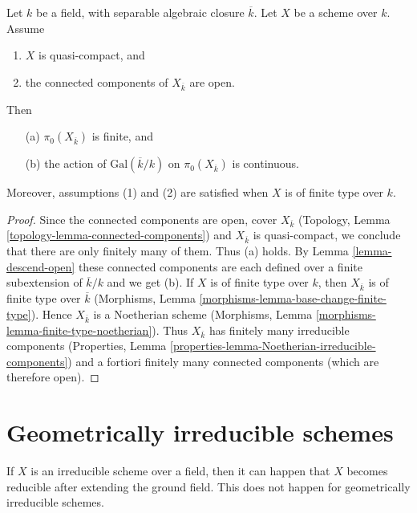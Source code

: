 \begin{lemma}
\label{lemma-galois-action-connected-components-continuous}
Let $k$ be a field, with separable algebraic closure $\overline{k}$.
Let $X$ be a scheme over $k$.
Assume
\begin{enumerate}
\item $X$ is quasi-compact, and
\item the connected components of $X_{\overline{k}}$ are open.
\end{enumerate}
Then
\begin{enumerate}
\item[(a)] $\pi_0(X_{\overline{k}})$ is finite, and
\item[(b)] the action of $\text{Gal}(\overline{k}/k)$ on
$\pi_0(X_{\overline{k}})$ is continuous.
\end{enumerate}
Moreover, assumptions (1) and (2) are satisfied when $X$ is
of finite type over $k$.
\end{lemma}

\begin{proof}
Since the connected components are open, cover $X_{\overline{k}}$
(Topology, Lemma \ref{topology-lemma-connected-components}) and
$X_{\overline{k}}$ is quasi-compact, we conclude that there are only
finitely many of them. Thus (a) holds.
By Lemma \ref{lemma-descend-open} these connected components
are each defined over a finite subextension of $\overline{k}/k$
and we get (b).
If $X$ is of finite type over $k$, then $X_{\overline{k}}$ is of finite
type over $\overline{k}$
(Morphisms, Lemma \ref{morphisms-lemma-base-change-finite-type}).
Hence $X_{\overline{k}}$ is a Noetherian scheme
(Morphisms, Lemma \ref{morphisms-lemma-finite-type-noetherian}).
Thus $X_{\overline{k}}$ has finitely many irreducible components
(Properties, Lemma \ref{properties-lemma-Noetherian-irreducible-components})
and a fortiori finitely many connected components (which are
therefore open).
\end{proof}









\section{Geometrically irreducible schemes}
\label{section-geometrically-irreducible}

\noindent
If $X$ is an irreducible scheme over a field, then it can happen that $X$
becomes reducible after extending the ground field. This does not happen
for geometrically irreducible schemes.

